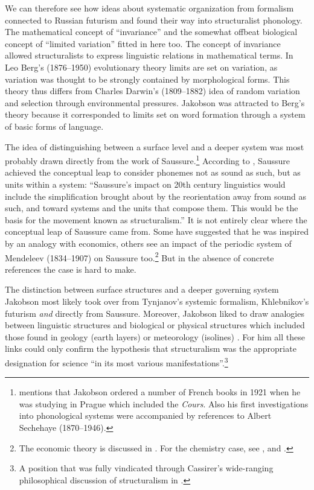 \documentclass[output=paper]{langscibook}
\begin{document}
We can therefore see how ideas about systematic organization from formalism connected to Russian futurism and found their way into structuralist phonology. The mathematical concept of ``invariance'' and the somewhat offbeat biological concept of ``limited variation'' fitted in here too. The concept of invariance allowed structuralists to express linguistic relations in mathematical terms. In Leo Berg's (1876--1950) evolutionary theory limits are set on variation, as variation was thought to be strongly contained by morphological forms. This theory thus differs from Charles Darwin's (1809--1882) idea of random variation and selection through environmental pressures. Jakobson was attracted to Berg's theory because it corresponded to limits set on word formation through a system of basic forms of language.

The idea of distinguishing between a surface level and a deeper system was most probably drawn directly from the work of Saussure.\footnote{\citet[88--94]{Toman1995} mentions that Jakobson ordered a number of French books in 1921 when he was studying in Prague which included the \emph{Cours}. Also his first investigations into phonological systems were accompanied by references to Albert Sechehaye (1870--1946).} According to \citet[237]{Joseph2010}, Saussure achieved the conceptual leap to consider phonemes not as sound as such, but as units within a system: ``Saussure's impact on 20th century linguistics would include the simplification brought about by the reorientation away from sound as such, and toward systems and the units that compose them. This would be the basis for the movement known as structuralism.” It is not entirely clear where the conceptual leap of Saussure came from. Some have suggested that he was inspired by an analogy with economics, others see an impact of the periodic system of Mendeleev (1834--1907) on Saussure too.\footnote{The economic theory is discussed in \citet{Joseph2014}. For the chemistry case, see \citet{Culler1976}, \citet{Clark2008} and \citet{Silverstein2016}.} But in the absence of concrete references the case is hard to make. 

The distinction between surface structures and a deeper governing system Jakobson most likely took over from Tynjanov's systemic formalism, Khlebnikov's futurism \emph{and} directly from Saussure. Moreover, Jakobson liked to draw analogies between linguistic structures and biological or physical structures which included those found in geology (earth layers) or meteorology (isolines) \citep[see][74--74, 188--194]{Holenstein1975}. For him all these links could only confirm the hypothesis that structuralism was the appropriate designation for science ``in its most various manifestations''.\footnote{A position that was fully vindicated through Cassirer's wide-ranging philosophical discussion of structuralism in \citet{Cassirer1945}.}  
\end{document}
